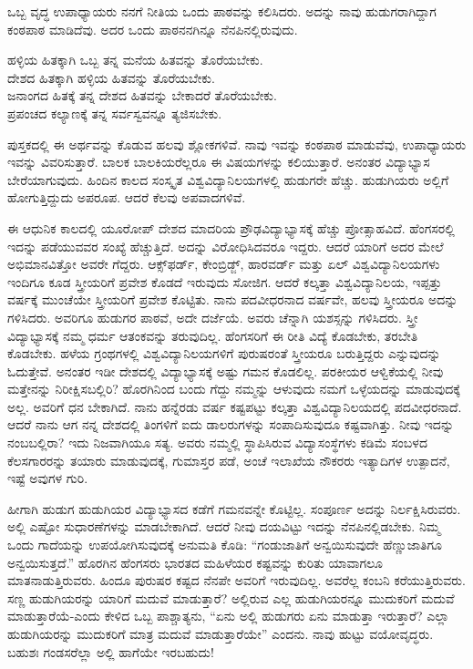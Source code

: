 ಒಬ್ಬ ವೃದ್ಧ ಉಪಾಧ್ಯಾಯರು ನನಗೆ ನೀತಿಯ ಒಂದು ಪಾಠವನ್ನು ಕಲಿಸಿದರು. ಅದನ್ನು ನಾವು ಹುಡುಗರಾಗಿದ್ದಾಗ ಕಂಠಪಾಠ ಮಾಡಿದೆವು. ಅದರ ಒಂದು ಪಾಠ\break ನನಗಿನ್ನೂ ನೆನಪಿನಲ್ಲಿರುವುದು.

\begin{myquote}
ಹಳ್ಳಿಯ ಹಿತಕ್ಕಾಗಿ ಒಬ್ಬ ತನ್ನ ಮನೆಯ ಹಿತವನ್ನು ತೊರೆಯಬೇಕು.\\ದೇಶದ ಹಿತಕ್ಕಾಗಿ ಹಳ್ಳಿಯ ಹಿತವನ್ನು ತೊರೆಯಬೇಕು.\\ಜನಾಂಗದ ಹಿತಕ್ಕೆ ತನ್ನ ದೇಶದ ಹಿತವನ್ನು ಬೇಕಾದರೆ ತೊರೆಯಬೇಕು.\\ಪ್ರಪಂಚದ ಕಲ್ಯಾಣಕ್ಕೆ ತನ್ನ ಸರ್ವಸ್ವವನ್ನೂ ತ್ಯಜಿಸಬೇಕು.
\end{myquote}

ಪುಸ್ತಕದಲ್ಲಿ ಈ ಅರ್ಥವನ್ನು ಕೊಡುವ ಹಲವು ಶ್ಲೋಕಗಳಿವೆ. ನಾವು ಇವನ್ನು ಕಂಠಪಾಠ ಮಾಡುವೆವು, ಉಪಾಧ್ಯಾಯರು ಇವನ್ನು ವಿವರಿಸುತ್ತಾರೆ. ಬಾಲಕ ಬಾಲಕಿಯರೆಲ್ಲರೂ ಈ ವಿಷಯಗಳನ್ನು ಕಲಿಯುತ್ತಾರೆ. ಅನಂತರ ವಿದ್ಯಾಭ್ಯಾಸ ಬೇರೆಯಾಗುವುದು. ಹಿಂದಿನ ಕಾಲದ ಸಂಸ್ಕೃತ ವಿಶ್ವವಿದ್ಯಾನಿಲಯಗಳಲ್ಲಿ ಹುಡುಗರೇ ಹೆಚ್ಚು. ಹುಡುಗಿಯರು ಅಲ್ಲಿಗೆ ಹೋಗುತ್ತಿದ್ದುದು ಅಪರೂಪ. ಆದರೆ ಕೆಲವು ಅಪವಾದಗಳಿವೆ.

ಈ ಆಧುನಿಕ ಕಾಲದಲ್ಲಿ ಯೂರೋಪ್​ ದೇಶದ ಮಾದರಿಯ ಪ್ರೌಢವಿದ್ಯಾಭ್ಯಾಸಕ್ಕೆ \break ಹೆಚ್ಚು ಪ್ರೋತ್ಸಾಹವಿದೆ. ಹೆಂಗಸರಲ್ಲಿ ಇದನ್ನು ಪಡೆಯುವವರ ಸಂಖ್ಯೆ ಹೆಚ್ಚುತ್ತಿದೆ. ಅದನ್ನು ವಿರೋಧಿಸಿದವರೂ ಇದ್ದರು. ಆದರೆ ಯಾರಿಗೆ ಅದರ ಮೇಲೆ ಅಭಿಮಾನವಿತ್ತೋ ಅವರೇ ಗೆದ್ದರು. ಆಕ್ಸ್​ಫರ್ಡ್​, ಕೇಂಬ್ರಿಡ್ಜ್​, ಹಾರವರ್ಡ್​ ಮತ್ತು ಏಲ್​ ವಿಶ್ವವಿದ್ಯಾನಿಲಯಗಳು ಇಂದಿಗೂ ಕೂಡ ಸ್ತ್ರೀಯರಿಗೆ ಪ್ರವೇಶ ಕೊಡದೆ ಇರುವುದು ಸೋಜಿಗ. ಆದರೆ ಕಲ್ಕತ್ತಾ ವಿಶ್ವವಿದ್ಯಾನಿಲಯ, ಇಪ್ಪತ್ತು ವರ್ಷಕ್ಕೆ ಮುಂಚೆಯೇ ಸ್ತ್ರೀಯರಿಗೆ ಪ್ರವೇಶ ಕೊಟ್ಟಿತು. ನಾನು ಪದವೀಧರನಾದ ವರ್ಷವೇ, ಹಲವು ಸ್ತ್ರೀಯರೂ ಅದನ್ನು ಗಳಿಸಿದರು. ಅವರಿಗೂ ಹುಡುಗರ ಪಾಠವೆ, ಅದೇ ದರ್ಜೆಯೆ. ಅವರು ಚೆನ್ನಾಗಿ ಯಶಸ್ಸನ್ನು ಗಳಿಸಿದರು. ಸ್ತ್ರೀ ವಿದ್ಯಾಭ್ಯಾಸಕ್ಕೆ ನಮ್ಮ ಧರ್ಮ ಆತಂಕವನ್ನು ತರುವುದಿಲ್ಲ. ಹೆಂಗಸರಿಗೆ ಈ ರೀತಿ ವಿದ್ಯೆ ಕೊಡಬೇಕು, ತರಬೇತಿ ಕೊಡಬೇಕು. ಹಳೆಯ ಗ್ರಂಥಗಳಲ್ಲಿ ವಿಶ್ವವಿದ್ಯಾನಿಲಯಗಳಿಗೆ ಪುರುಷರಂತೆ ಸ್ತ್ರೀಯರೂ ಬರುತ್ತಿದ್ದರು ಎನ್ನುವುದನ್ನು ಓದುತ್ತೇವೆ. ಅನಂತರ ಇಡೀ ದೇಶದಲ್ಲಿ ವಿದ್ಯಾಭ್ಯಾಸಕ್ಕೆ ಅಷ್ಟು ಗಮನ ಕೊಡಲಿಲ್ಲ. ಪರಕೀಯರ ಆಳ್ವಿಕೆಯಲ್ಲಿ ನೀವು ಮತ್ತೇನನ್ನು ನಿರೀಕ್ಷಿಸಬಲ್ಲಿರಿ? ಹೊರಗಿನಿಂದ ಬಂದು ಗೆದ್ದು ನಮ್ಮನ್ನು ಆಳುವುದು ನಮಗೆ ಒಳ್ಳೆಯದನ್ನು ಮಾಡುವುದಕ್ಕೆ ಅಲ್ಲ. ಅವರಿಗೆ ಧನ ಬೇಕಾಗಿದೆ. ನಾನು ಹನ್ನೆರಡು ವರ್ಷ ಕಷ್ಟಪಟ್ಟು ಕಲ್ಕತ್ತಾ ವಿಶ್ವವಿದ್ಯಾನಿಲಯದಲ್ಲಿ ಪದವೀಧರನಾದೆ. ಆದರೆ ನಾನು ಆಗ ನನ್ನ ದೇಶದಲ್ಲಿ ತಿಂಗಳಿಗೆ ಐದು ಡಾಲರುಗಳನ್ನು ಸಂಪಾದಿಸುವುದೂ ಕಷ್ಟವಾಗಿತ್ತು. ನೀವು ಇದನ್ನು ನಂಬಬಲ್ಲಿರಾ? ಇದು ನಿಜವಾಗಿಯೂ ಸತ್ಯ. ಅವರು ನಮ್ಮಲ್ಲಿ ಸ್ಥಾಪಿಸಿರುವ ವಿದ್ಯಾಸಂಸ್ಥೆಗಳು ಕಡಿಮೆ ಸಂಬಳದ ಕೆಲಸಗಾರರನ್ನು ತಯಾರು ಮಾಡುವುದಕ್ಕೆ, ಗುಮಾಸ್ತರ ಪಡೆ, ಅಂಚೆ ಇಲಾಖೆಯ ನೌಕರರು ಇತ್ಯಾದಿಗಳ ಉತ್ಪಾದನೆ, ಇಷ್ಟೆ ಅವುಗಳ ಗುರಿ.

ಹೀಗಾಗಿ ಹುಡುಗ ಹುಡುಗಿಯರ ವಿದ್ಯಾಭ್ಯಾಸದ ಕಡೆಗೆ ಗಮನವನ್ನೇ ಕೊಟ್ಟಿಲ್ಲ. ಸಂಪೂರ್ಣ ಅದನ್ನು ನಿರ್ಲಕ್ಷಿಸಿರುವರು. ಅಲ್ಲಿ ಎಷ್ಟೋ ಸುಧಾರಣೆಗಳನ್ನು ಮಾಡಬೇಕಾಗಿದೆ. ಆದರೆ ನೀವು ದಯವಿಟ್ಟು ಇದನ್ನು ನೆನಪಿನಲ್ಲಿಡಬೇಕು. ನಿಮ್ಮ ಒಂದು ಗಾದೆಯನ್ನು ಉಪಯೋಗಿಸುವುದಕ್ಕೆ ಅನುಮತಿ ಕೊಡಿ: “ಗಂಡುಜಾತಿಗೆ ಅನ್ವಯಿಸುವುದೇ ಹೆಣ್ಣುಜಾತಿಗೂ ಅನ್ವಯಿಸುತ್ತದೆ.” ಹೊರಗಿನ ಹೆಂಗಸರು ಭಾರತದ ಮಹಿಳೆಯರ ಕಷ್ಟವನ್ನು ಕುರಿತು ಯಾವಾಗಲೂ ಮಾತನಾಡುತ್ತಿರುವರು. ಹಿಂದೂ ಪುರುಷರ ಕಷ್ಟದ ನೆನಪೇ ಅವರಿಗೆ ಇರುವುದಿಲ್ಲ. ಅವರೆಲ್ಲ ಕಂಬನಿ ಕರೆಯುತ್ತಿರುವರು. ಸಣ್ಣ ಹುಡುಗಿಯರನ್ನು ಯಾರಿಗೆ ಮದುವೆ ಮಾಡುತ್ತಾರೆ? ಅಲ್ಲಿರುವ ಎಲ್ಲ ಹುಡುಗಿಯರನ್ನೂ ಮುದುಕರಿಗೆ ಮದುವೆ ಮಾಡುತ್ತಾರೆಯೆ-ಎಂದು ಕೇಳಿದ ಒಬ್ಬ ಪಾಶ್ಚಾತ್ಯನು, “ಏನು ಅಲ್ಲಿ ಹುಡುಗರು ಏನು ಮಾಡುತ್ತಾ ಇರುತ್ತಾರೆ? ಎಲ್ಲಾ ಹುಡುಗಿಯರನ್ನು ಮುದುಕರಿಗೆ ಮಾತ್ರ ಮದುವೆ ಮಾಡುತ್ತಾರೆಯೇ” ಎಂದನು. ನಾವು ಹುಟ್ಟು ವಯೋವೃದ್ಧರು. ಬಹುಶಃ ಗಂಡಸರೆಲ್ಲಾ ಅಲ್ಲಿ ಹಾಗೆಯೇ ಇರಬಹುದು!

